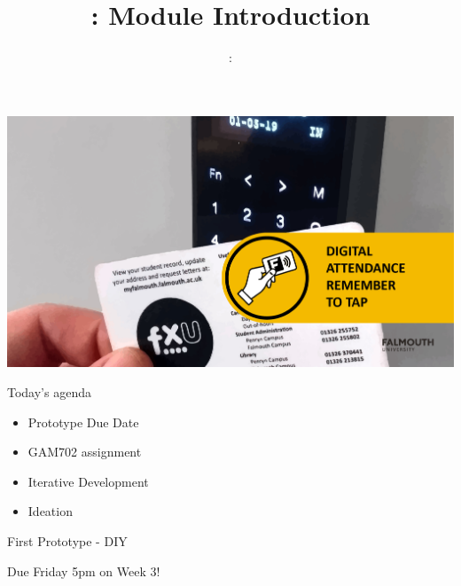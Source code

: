 \usepackage{../../beamerthemeFalmouthGamesAcademy}
\usepackage{multimedia}
\graphicspath{ {../../} }


\usepackage[normalem]{ulem}
\usepackage{wasysym}
\usepackage{graphicx} %

\usepackage{pdfpages}

\usetikzlibrary{arrows,automata}





\title{\sessionnumber: Module Introduction}
\subtitle{\modulecode: \moduletitle}

\begin{frame}
	\includegraphics[width=1.0\textwidth]{sign-in}
\end{frame}

\frame{\titlepage} 


\begin{frame}{Today's agenda}
	\begin{itemize}
		\item Prototype Due Date
		\item GAM702 assignment
		\item Iterative Development
		\item Ideation
	\end{itemize}
\end{frame}

\begin{frame}{First Prototype - DIY}
\begin{center}
	\Huge{Due Friday 5pm on Week 3!}
\end{center}
\end{frame}

